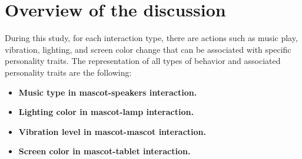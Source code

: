 \section{Overview of the discussion}
\label{sec:overview-of-the-discussion}
During this study, for each interaction type, there are actions such as music play, vibration, lighting, and
screen color change that can be associated with specific personality traits.
The representation of all types of behavior and associated personality traits are the following:

\begin{itemize}
    \renewcommand{\labelitemi}{$\Rightarrow$}
    \item \textbf{Music type in mascot-speakers interaction.}

    \item \textbf{Lighting color in mascot-lamp interaction.}

    \item \textbf{Vibration level in mascot-mascot interaction.}

    \item \textbf{Screen color in mascot-tablet interaction.}
\end{itemize}